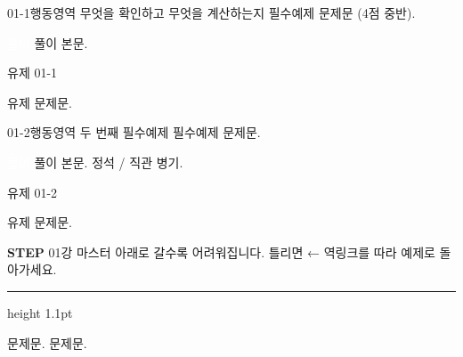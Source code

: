 \vfill
{}

\vfill
{}
\newpage

\begin{mainex}{01-1}{행동영역 \; 무엇을 확인하고 무엇을 계산하는지}
필수예제 문제문 (4점 중반).


{\sffamily\footnotesize\colorbox{ink}{\textcolor{white}{\cjkbold 풀이}}}\quad
풀이 본문.
\end{mainex}

\par\vspace{8mm}\noindent
{\sffamily\cjkbold\textcolor{prime}{유제 01-1}}\; \chips
\par\vspace{2mm}
유제 문제문.
\vfill
{}
\newpage

\begin{mainex}{01-2}{행동영역 \; 두 번째 필수예제}
필수예제 문제문.


{\sffamily\footnotesize\colorbox{ink}{\textcolor{white}{\cjkbold 풀이}}}\quad
풀이 본문. \lbljs\; 정석 / \lbldg\; 직관 병기.
\end{mainex}

\par\vspace{8mm}\noindent
{\sffamily\cjkbold\textcolor{prime}{유제 01-2}}\; \chips
\par\vspace{2mm}
유제 문제문.
\vfill
{}
\newpage
{}

{\sffamily\fontsize{15}{18}\selectfont\textcolor{prime}{\textbf{STEP}}\hspace{2mm}%
 {\cjkblack\fontsize{13.5}{17}\selectfont\textcolor{ink}{01강 마스터}}}%
\hfill{\sffamily\fontsize{8}{10}\selectfont\textcolor{gray60}{\cjkmed 아래로 갈수록 어려워집니다. \;틀리면 ← 역링크를 따라 예제로 돌아가세요.}}\par
\vspace{2.4mm}
{\color{prime}\hrule height 1.1pt}
\vspace{6mm}

\noindent
{}
문제문.
\vfill
{}
\rowrule
\vspace{5mm}
\noindent
{}
문제문.
\vfill
{}
\newpage
{}

